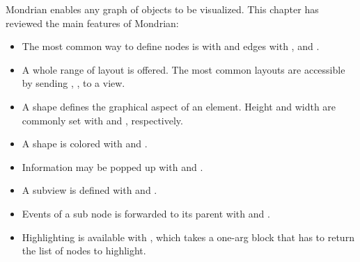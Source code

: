 \documentclass[a4paper,10pt,twoside]{book}
\begin{document}
Mondrian enables any graph of objects to be visualized. This chapter has reviewed the main features of Mondrian:
\begin{itemize}
\item The most common way to define nodes is with  and edges with ,  and .
\item A whole range of layout is offered. The most common layouts are accessible by sending , ,  to a view.
\item A shape defines the graphical aspect of an element. Height and width are commonly set with  and , respectively. 
\item A shape is colored with  and .
\item Information may be popped up with  and .
\item A subview is defined with  and .
\item Events of a sub node is forwarded to its parent with  and .
\item Highlighting is available with , which takes a one-arg block that has to return the list of nodes to highlight.
\end{itemize}

%
%


\ifx\wholebook\relax\else
   
   
\end{document}
